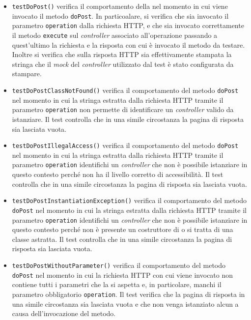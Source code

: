 \begin{itemize}
\begin{itemize}
\item \texttt{testDoPost()} verifica il comportamento della  nel momento in cui viene invocato il metodo \texttt{doPost}. In particoalare, si verifica che sia invocato il parametro \texttt{operation} dalla richiesta HTTP, e che sia invocato correttamente il metodo \texttt{execute} sul \textit{controller} associato all'operazione passando a quest'ultimo la richiesta e la risposta con cui è invocato il metodo da testare. Inoltre si verifica che sulla risposta HTTP sia effettivamente stampata la stringa che il \textit{mock} del \textit{controller} utilizzato dal test è stato configurata da stampare.

\item \texttt{testDoPostClassNotFound()} verifica il comportamento del metodo \texttt{doPost} nel momento in cui la stringa estratta dalla richiesta HTTP tramite il parametro \texttt{operation} non permette di identificare un \textit{controller} valido da istanziare. Il test controlla che in una simile circostanza la pagina di risposta sia lasciata vuota.

\item \texttt{testDoPostIllegalAccess()} verifica il comportamento del metodo \texttt{doPost} nel momento in cui la stringa estratta dalla richiesta HTTP tramite il parametro \texttt{operation} identifichi un \textit{controller} che non è possibile istanziare in questo contesto perché non ha il livello corretto di accessibilità. Il test controlla che in una simile circostanza la pagina di risposta sia lasciata vuota.

\item \texttt{testDoPostInstantiationException()} verifica il comportamento del metodo \texttt{doPost} nel momento in cui la stringa estratta dalla richiesta HTTP tramite il parametro \texttt{operation} identifichi un \textit{controller} che non è possibile istanziare in questo contesto perché non è presente un costruttore di  o si tratta di una classe astratta. Il test controlla che in una simile circostanza la pagina di risposta sia lasciata vuota.

\item \texttt{testDoPostWithoutParameter()} verifica il comportamento del metodo \texttt{doPost} nel momento in cui la richiesta HTTP con cui viene invocato non contiene tutti i parametri che la  si aspetta e, in particolare, manchi il parametro obbligatorio \texttt{operation}. Il test verifica che la pagina di risposta in una simile circostanza sia lasciata vuota e che non venga istanziato alcun  a causa dell'invocazione del metodo.


\end{itemize}
\end{itemize}
